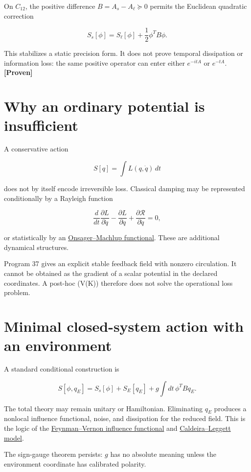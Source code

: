 \documentclass[11pt,a4paper,openany]{report}
\newcommand{\statusProven}{\textcolor{fingreen}{[Proven]}}
\begin{document}
On \(C_{12}\), the positive difference \(B=A_s-A_\ell\succeq0\) permits the Euclidean quadratic correction

\[
S_s[\phi]
=S_\ell[\phi]
+\frac12\phi^TB\phi.
\]

This stabilizes a static precision form. It does not prove temporal dissipation or information loss: the same positive operator can enter either \(e^{-itA}\) or \(e^{-tA}\). \textbf{\statusProven{}}

\section{Why an ordinary potential is insufficient}

A conservative action

\[
S[q]=\int L(q,\dot q)\,dt
\]

does not by itself encode irreversible loss. Classical damping may be represented conditionally by a Rayleigh function

\[
\frac{d}{dt}\frac{\partial L}{\partial\dot q}
-\frac{\partial L}{\partial q}
+\frac{\partial\mathcal R}{\partial\dot q}=0,
\]

or statistically by an \href{https://doi.org/10.1103/PhysRev.91.1505}{Onsager–Machlup functional}. These are additional dynamical structures.

Program 37 gives an explicit stable feedback field with nonzero circulation. It cannot be obtained as the gradient of a scalar potential in the declared coordinates. A post-hoc (V(K)) therefore does not solve the operational loss problem.

\section{Minimal closed-system action with an environment}

A standard conditional construction is

\[
S[\phi,q_E]
=S_s[\phi]+S_E[q_E]
+g\int dt\,\phi^TBq_E.
\]

The total theory may remain unitary or Hamiltonian. Eliminating \(q_E\) produces a nonlocal influence functional, noise, and dissipation for the reduced field. This is the logic of the \href{https://doi.org/10.1016/0003-4916(63)90068-X}{Feynman–Vernon influence functional} and \href{https://doi.org/10.1016/0003-4916(83)90202-6}{Caldeira–Leggett model}.

The sign-gauge theorem persists: \(g\) has no absolute meaning unless the environment coordinate has calibrated polarity.
\end{document}
